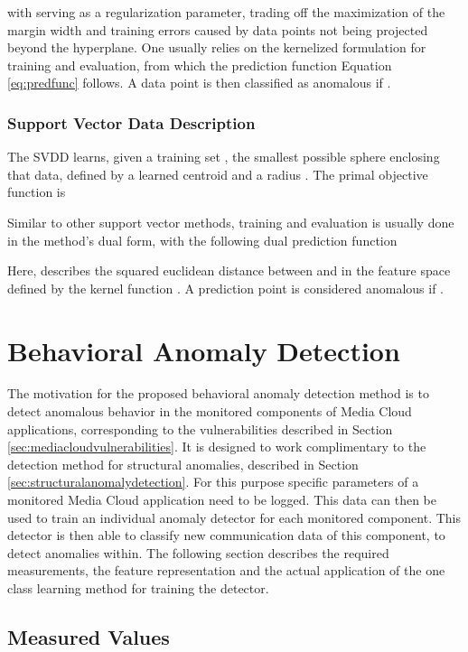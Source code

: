 \documentclass{llncs}
\begin{document}
with  serving as a regularization parameter, trading off the maximization of the margin width  and training errors  caused by data points not being projected beyond the hyperplane. One usually relies on the kernelized formulation for training and evaluation, from which the prediction function Equation \ref{eq:predfunc} follows. A data point  is then classified as anomalous if .


\subsubsection{Support Vector Data Description}



The SVDD learns, given a training set ,  the smallest possible sphere enclosing that data, defined by a learned centroid  and a radius . The primal objective function is

Similar to other support vector methods, training and evaluation is usually done in the method's dual form, with the following dual prediction function

Here,  describes the squared euclidean distance between  and  in the feature space defined by the kernel function . A prediction point  is considered anomalous if .
%
 
\section{Behavioral Anomaly Detection}
\label{sec:behavioralanomalydetection}

The motivation for the proposed behavioral anomaly detection method is to detect anomalous behavior in the monitored components of Media Cloud applications, corresponding to the vulnerabilities described in Section \ref{sec:mediacloudvulnerabilities}. It is designed to work complimentary to the detection method for structural anomalies, described in Section \ref{sec:structuralanomalydetection}. For this purpose specific parameters of a monitored Media Cloud application need to be logged. This data can then be used to train an individual anomaly detector for each monitored component. This detector is then able to classify new communication data of this component, to detect anomalies within. The following section describes the required measurements, the feature representation and the actual application of the one class learning method for training the detector.

\subsection{Measured Values}
\label{measuredvalues}
\end{document}
